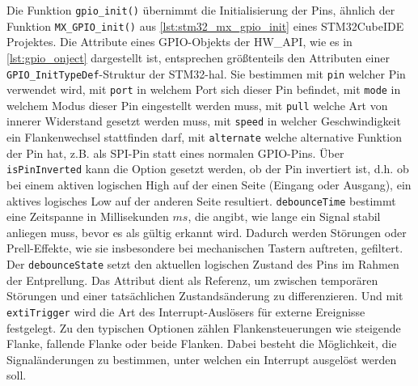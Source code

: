 Die Funktion \texttt{gpio\_init()} übernimmt die Initialisierung der Pins, ähnlich der Funktion \texttt{MX\_GPIO\_init()} aus \cref{lst:stm32_mx_gpio_init} eines STM32CubeIDE Projektes.
Die Attribute eines GPIO-Objekts der HW\_API, wie es in \cref{lst:gpio_onject} dargestellt ist, entsprechen größtenteils den Attributen einer \texttt{GPIO\_InitTypeDef}-Struktur der STM32-\gls{hal}.
Sie bestimmen mit \texttt{pin} welcher Pin verwendet wird, mit \texttt{port} in welchem Port sich dieser Pin befindet, mit \texttt{mode} in welchem Modus dieser Pin eingestellt werden muss, mit \texttt{pull} welche Art von innerer Widerstand gesetzt werden muss, mit \texttt{speed} in welcher Geschwindigkeit ein Flankenwechsel stattfinden darf, mit \texttt{alternate} welche alternative Funktion der Pin hat, z.B. als SPI-Pin statt eines normalen GPIO-Pins.
Über \texttt{isPinInverted} kann die Option gesetzt werden, ob der Pin invertiert ist, d.h. ob bei einem aktiven logischen High auf der einen Seite (Eingang oder Ausgang), ein aktives logisches Low auf der anderen Seite resultiert.
\texttt{debounceTime} bestimmt eine Zeitspanne in Millisekunden $ms$, die angibt, wie lange ein Signal stabil anliegen muss, bevor es als gültig erkannt wird. 
Dadurch werden Störungen oder Prell-Effekte, wie sie insbesondere bei mechanischen Tastern auftreten, gefiltert.
Der \texttt{debounceState} setzt den aktuellen logischen Zustand des Pins im Rahmen der Entprellung. 
Das Attribut dient als Referenz, um zwischen temporären Störungen und einer tatsächlichen Zustandsänderung zu differenzieren.
Und mit \texttt{extiTrigger} wird die Art des Interrupt-Auslösers für externe Ereignisse festgelegt. 
Zu den typischen Optionen zählen Flankensteuerungen wie steigende Flanke, fallende Flanke oder beide Flanken. 
Dabei besteht die Möglichkeit, die Signaländerungen zu bestimmen, unter welchen ein Interrupt ausgelöst werden soll.

